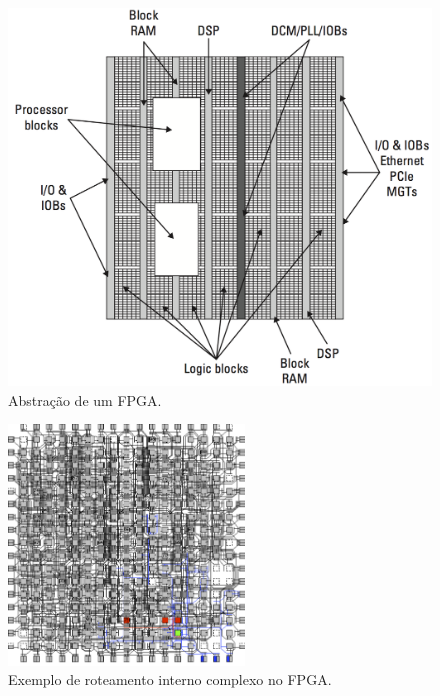 	\begin{frame}%
		\begin{figure}[h]
			\centering
			\includegraphics[height=1\textheight]{img/fpga/abstracao.png}
			\caption{Abstração de um FPGA.}
			\label{fig:abstracao}
		\end{figure}
	\end{frame}

	\begin{frame}%
		\begin{figure}[h]
			\centering
			\includegraphics[width=0.56\textwidth]{img/fpga/exemploFinal.png}
			\caption{Exemplo de roteamento interno complexo no FPGA.}
			\label{fig:exemploFinal}
		\end{figure}
	\end{frame}

